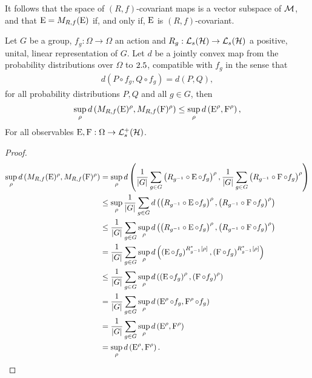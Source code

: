 It follows that the space of $(R,f)$-covariant maps is a vector subspace of $\mathcal{M}$, and that $\operatorname{E}=M_{R,f}(\operatorname{E})$ if, and only if, $\operatorname{E}$ is $(R,f)$-covariant.

\begin{thm}
  \label{thm:inv-mean-reduces-error}
  Let $G$ be a group, $f_g:\Omega\to\Omega$ an action and $R_g:\saops[\hcal]\to\saops[\hcal]$ a positive, unital, linear representation of $G$. Let $d$ be a jointly convex map from the probability distributions over $\Omega$ to $2.5$, compatible with $f_g$ in the sense that
  \begin{align}\label{eqn:group-rep-error-compat}
    d(P\circ f_g, Q\circ f_g) = d(P,Q),
  \end{align}
  for all probability distributions $P,Q$ and all $g\in G$, then
  \begin{align}
    \sup_\rho d\left(M_{R,f}(\operatorname{E})^\rho, M_{R,f}(\operatorname{F})^\rho\right) \leq \sup_\rho d\left(\operatorname{E}^\rho,\operatorname{F}^\rho\right),
  \end{align}
  For all observables $\ope, \opf:\Omega\to\posops[\hcal]$.
  \begin{proof}
    \begin{align}
      \sup_\rho d\left(M_{R,f}(\operatorname{E})^\rho, M_{R,f}(\operatorname{F})^\rho\right) &= \sup_\rho d\left( \frac{1}{{\left\lvert{G}\right\rvert}}\sum_{g\in G} \left(R_{g^{-1}} \circ \operatorname{E}\circ f_g\right)^\rho , \frac{1}{{\left\lvert{G}\right\rvert}}\sum_{g\in G}\left(R_{g^{-1}} \circ \operatorname{F}\circ f_g\right)^\rho \right)\\
                                                                     &\leq \sup_\rho \frac{1}{{\left\lvert{G}\right\rvert}}\sum_{g\in G} d\left( \left(R_{g^{-1}} \circ \operatorname{E}\circ f_g\right)^\rho ,\left(R_{g^{-1}} \circ \operatorname{F}\circ f_g\right)^\rho \right)\\
                                                                     &\leq \frac{1}{{\left\lvert{G}\right\rvert}}\sum_{g\in G}\sup_\rho d\left( \left(R_{g^{-1}} \circ \operatorname{E}\circ f_g\right)^\rho ,\left(R_{g^{-1}} \circ \operatorname{F}\circ f_g\right)^\rho \right)\\
                                                                     &= \frac{1}{{\left\lvert{G}\right\rvert}}\sum_{g\in G}\sup_\rho d\left( \left( \operatorname{E}\circ f_g\right)^{R_{g^{-1}}^*[\rho]} ,\left(\operatorname{F}\circ f_g\right)^{R_{g^{-1}}^*[\rho]} \right)\\
                                                                     &\leq \frac{1}{{\left\lvert{G}\right\rvert}}\sum_{g\in G}\sup_\rho d\left( \left( \operatorname{E}\circ f_g\right)^{\rho} ,\left(\operatorname{F}\circ f_g\right)^{\rho} \right)\\
                                                                     &= \frac{1}{{\left\lvert{G}\right\rvert}}\sum_{g\in G}\sup_\rho d\left( \operatorname{E}^{\rho}\circ f_g , \operatorname{F}^{\rho}\circ f_g \right)\\
                                                                     &= \frac{1}{{\left\lvert{G}\right\rvert}}\sum_{g\in G}\sup_\rho d\left(\operatorname{E}^{\rho} ,\operatorname{F}^{\rho}\right)\\
                                                                     &= \sup_\rho d\left(\operatorname{E}^{\rho} ,\operatorname{F}^{\rho}\right).
    \end{align}
  \end{proof}
\end{thm}


